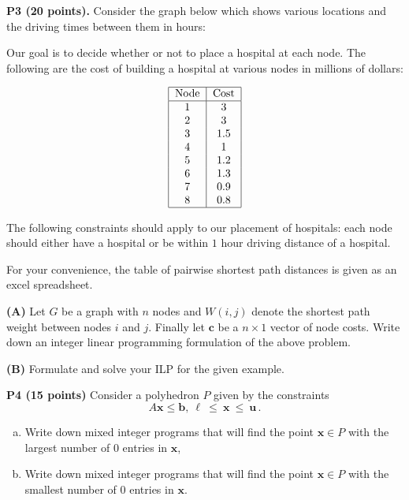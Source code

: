 \documentclass[11pt]{article}
\begin{document}
\medskip

\noindent\textbf{P3 (20 points).}  Consider the graph below
which shows various locations and the driving times between them in hours:

\begin{center}
\end{center}

Our goal is to decide whether or not to place a hospital at each node.
The following are the cost of building a hospital at various nodes
in millions of dollars:

\[\begin{tabular}{|c|c|}
\hline
\mbox{Node} & \mbox{Cost}\\
\hline
1 & 3 \\
2 & 3 \\
3 & 1.5 \\
4 & 1 \\
5 & 1.2 \\
6 & 1.3 \\
7 & 0.9 \\
8 & 0.8 \\
\hline
\end{tabular}\]

The following constraints should apply to our placement of hospitals:
each node should either have a hospital or be within $1$ hour driving
distance of a hospital.

For your convenience, the table of pairwise shortest path distances is given 
as an excel spreadsheet.

\noindent\textbf{(A)} Let $G$ be a graph with $n$ nodes
and $W(i,j)$ denote the shortest path weight between nodes $i$ and $j$.
Finally let $\mathbf{c}$ be a $n \times 1$ vector of node costs.
Write down an integer linear programming formulation of the above problem.

\noindent\textbf{(B)} Formulate and solve your ILP for the given example.

\medskip

\noindent\textbf{P4 (15 points)} Consider a polyhedron $P$ given
by the constraints
 \[ A \mathbf{x} \leq \mathbf{b},\ \mathbf{\ell}\ \leq\ \mathbf{x}\ \leq\ \mathbf{u}\,. \]


\begin{enumerate}[(a)]
\item  Write down mixed integer programs that will find the
point $\mathbf{x} \in P$ with the largest number of
$0$ entries in $\mathbf{x}$, 
\item Write down mixed integer programs that will find the
point $\mathbf{x} \in P$ with the smallest number of $0$ entries in $\mathbf{x}$.
\end{enumerate}
\end{document}

